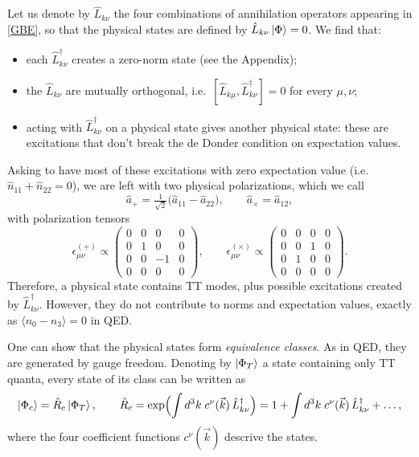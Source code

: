 \documentclass[12pt,a4paper,oneside]{article}
\numberwithin{equation}{section}   %
\begin{document}
Let us denote by $\hat L_{k\nu}$ the four combinations of annihilation operators
appearing in \eqref{GBE}, so that the physical states are defined by
$\hat L_{k\nu}\ket{\Phi}=0$. We find that:
\begin{itemize}
\item each $\hat L^\dagger_{k\nu}$ creates a zero-norm state (see the Appendix);
\item the $\hat L_{k\nu}$ are mutually orthogonal, i.e.\
$[\hat L_{k\mu},\hat L^\dagger_{k\nu}]=0$ for every $\mu,\nu$;
\item acting with $\hat L^\dagger_{k\nu}$ on a physical state gives
another physical state: these are excitations that don't break the de Donder
condition on expectation values.
\end{itemize}
Asking to have most of these excitations with zero expectation value (i.e.
$\hat{n}_{11}+\hat{n}_{22}=0$), we are left with
two physical polarizations, which we call
\begin{equation}
\hat a_{+}=\tfrac{1}{\sqrt2}\bigl(\hat a_{11}-\hat a_{22}\bigr),\qquad
\hat a_{\times}=\hat a_{12},
\end{equation}
with polarization tensors
\begin{equation}
\epsilon^{(+)}_{\mu\nu}\propto
\begin{pmatrix}
0 & 0 & 0 & 0 \\
0 & 1 & 0 & 0 \\
0 & 0 & -1 & 0 \\
0 & 0 & 0 & 0
\end{pmatrix},
\qquad
\epsilon^{(\times)}_{\mu\nu}\propto
\begin{pmatrix}
0 & 0 & 0 & 0 \\
0 & 0 & 1 & 0 \\
0 & 1 & 0 & 0 \\
0 & 0 & 0 & 0
\end{pmatrix}.
\end{equation}
Therefore, a physical state contains TT modes, plus possible
excitations created by $\hat L^\dagger_{k\nu}$. However, they
 do not contribute to norms and
expectation values, exactly as $\langle n_0-n_3\rangle=0$ in QED.

One can show that the physical states form \textit{equivalence
classes}. As in QED, they are generated by gauge freedom.
Denoting by $\ket{\Phi_T}$ a state containing only TT quanta, every state of its
class can be written as
\begin{equation}
    \ket{\Phi_c} = \hat{R}_c \ket{\Phi_T},\qquad
    \hat{R}_c=\exp\Bigl(\int d^3k\; c^\nu(\vec k)\, \hat{L}^\dagger_{k\nu}\Bigr)
    =1+\int d^3k\; c^\nu(\vec k)\, \hat{L}^\dagger_{k\nu}+\dots ,
\end{equation}
where the four coefficient functions $c^\nu(\vec k)$ descrive the states.
\end{document}
